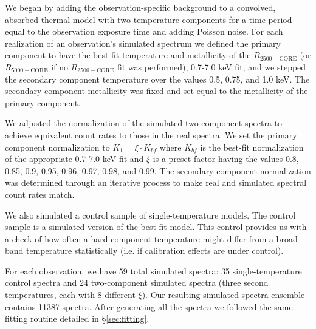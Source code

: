 \documentclass{emulateapj}
\newcommand{\rtwf}{$R_{2500-\text{CORE}}$ }
\newcommand{\rfif}{$R_{5000-\text{CORE}}$ }
\begin{document}
We began by adding the observation-specific background to a convolved,
absorbed thermal model with two temperature components for a time
period equal to the observation exposure time and adding Poisson
noise. For each realization of an observation's simulated spectrum we
defined the primary component to have the best-fit temperature and
metallicity of the \rtwf (or \rfif if no \rtwf fit was performed),
0.7-7.0 keV fit, and we stepped the secondary component temperature
over the values 0.5, 0.75, and 1.0 keV. The secondary component
metallicity was fixed and set equal to the metallicity of the primary
component.

We adjusted the normalization of the simulated two-component spectra to
achieve equivalent count rates to those in the real spectra. We set
the primary component normalization to $K_1 = \xi \cdot K_{bf}$ where
$K_{bf}$ is the best-fit normalization of the appropriate
0.7-7.0 keV fit and $\xi$ is a preset factor having the values 0.8,
0.85, 0.9, 0.95, 0.96, 0.97, 0.98, and 0.99. The secondary component
normalization was determined through an iterative process to make real
and simulated spectral count rates match.

We also simulated a control sample of single-temperature models. The
control sample is a simulated version of the best-fit model. This
control provides us with a check of how often a hard component
temperature might differ from a broad-band temperature statistically
(i.e. if calibration effects are under control).

For each observation, we have 59 total simulated spectra: 35
single-temperature control spectra and 24 two-component simulated
spectra (three second temperatures, each with 8 different $\xi$). Our
resulting simulated spectra ensemble contains 11387 spectra. After
generating all the spectra we followed the same fitting routine detailed
in \S\ref{sec:fitting}.
\end{document}
